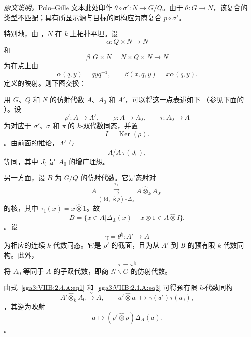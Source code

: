 \smallskip\noindent\emph{原文说明。}Polo--Gille 文本此处印作 \(\theta\circ\sigma':N\to G/Q\)。由于 \(\theta:G\to N\)，该复合的类型不匹配；具有所显示源与目标的同构应为商复合 \(p\circ\sigma'\)。

\smallskip 特别地，由  \textup{}，\(N\) 在 \(k\) 上拓扑平坦。设 \[
  \alpha:Q\times N\longrightarrow N
\] 和 \[
  \beta:G\times N=N\times Q\times N\longrightarrow N
\] 为在点上由 \[
  \alpha(q,y)=qyq^{-1},
  \qquad
  \beta(x,q,y)=x\alpha(q,y).
\] 定义的映射。则下图交换：\begin{center} \label{sga3:VIIB:2.4.A:eq4-diagram} \end{center}

用 \(G\)、\(Q\) 和 \(N\) 的仿射代数 \(A\)、\(A_0\) 和 \(A'\)，可以将这一点表述如下 \textup{（参见下面的 ）}。设 \[
  \rho':A\longrightarrow A',
  \qquad
  \rho:A\longrightarrow A_0,
  \qquad
  \tau:A_0\longrightarrow A
\] 为对应于 \(\sigma'\)、\(\sigma\) 和 \(\pi\) 的 \(k\)-双代数同态，并置 \[
  I=\operatorname{Ker}(\rho).
\]。由前面的推论，\(A'\) 与 \[
  A\big/\overline{A\,\tau(J_0)},
\] 等同，其中 \(J_0\) 是 \(A_0\) 的增广理想。

另一方面，设 \(B\) 为 \(G/Q\) 的仿射代数。它是态射对  \label{sga3:VIIB:2.4.A:affine-equalizer-pair} \begin{equation*}
  A
  \mathrel{\overset{\tau_1}
    {\underset{(\operatorname{id}_A\widehat\otimes\rho)
      \circ\Delta_A}{\rightrightarrows}}}
  A\widehat\otimes_kA_0,
\end{equation*} 的核，其中 \(\tau_1(x)=x\widehat\otimes1\)。故 \[
  B
  =
  \bigl\{
    x\in A
    \mathrel{\big|}
    \Delta_A(x)-x\widehat\otimes1
    \in A\widehat\otimes I
  \bigr\}.
\]。设 \[
  \gamma=\theta^\natural:A'\longrightarrow A
\] 为相应的连续 \(k\)-代数同态。它是 \(\rho'\) 的截面，且为从 \(A'\) 到 \(B\) 的预有限 \(k\)-代数同构。此外，\[
  \tau=\pi^\natural
\] 将 \(A_0\) 等同于 \(A\) 的子双代数，即商 \(N\backslash G\) 的仿射代数。

由式~\eqref{sga3:VIIB:2.4.A:eq1} 和~\eqref{sga3:VIIB:2.4.A:eq3} 可得预有限 \(k\)-代数同构 \begin{equation}
  A'\widehat\otimes_kA_0
  \xrightarrow{\ \sim\ }
  A,
  \qquad
  a'\widehat\otimes a_0
  \longmapsto
  \gamma(a')\tau(a_0),
  \tag{*}
  \label{sga3:VIIB:2.4.A:star}
\end{equation}，其逆为映射 \[
  a\longmapsto
  (\rho'\widehat\otimes\rho)\Delta_A(a).
\]。

